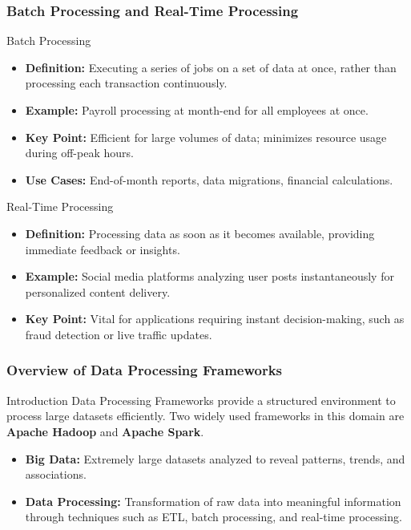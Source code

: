 \documentclass[aspectratio=169]{beamer}
\begin{document}
\begin{frame}[fragile]
    \frametitle{Batch Processing and Real-Time Processing}
    \begin{block}{Batch Processing}
        \begin{itemize}
            \item \textbf{Definition:} Executing a series of jobs on a set of data at once, rather than processing each transaction continuously.
            \item \textbf{Example:} Payroll processing at month-end for all employees at once.
            \item \textbf{Key Point:} Efficient for large volumes of data; minimizes resource usage during off-peak hours.
            \item \textbf{Use Cases:} End-of-month reports, data migrations, financial calculations.
        \end{itemize}
    \end{block}

    \begin{block}{Real-Time Processing}
        \begin{itemize}
            \item \textbf{Definition:} Processing data as soon as it becomes available, providing immediate feedback or insights.
            \item \textbf{Example:} Social media platforms analyzing user posts instantaneously for personalized content delivery.
            \item \textbf{Key Point:} Vital for applications requiring instant decision-making, such as fraud detection or live traffic updates.
        \end{itemize}
    \end{block}
\end{frame}

\begin{frame}[fragile]
    \frametitle{Overview of Data Processing Frameworks}
    
    \begin{block}{Introduction}
    Data Processing Frameworks provide a structured environment to process large datasets efficiently. Two widely used frameworks in this domain are \textbf{Apache Hadoop} and \textbf{Apache Spark}.
    \end{block}
    
    \begin{itemize}
        \item \textbf{Big Data:} Extremely large datasets analyzed to reveal patterns, trends, and associations.
        \item \textbf{Data Processing:} Transformation of raw data into meaningful information through techniques such as ETL, batch processing, and real-time processing.
    \end{itemize}
\end{frame}
\end{document}
